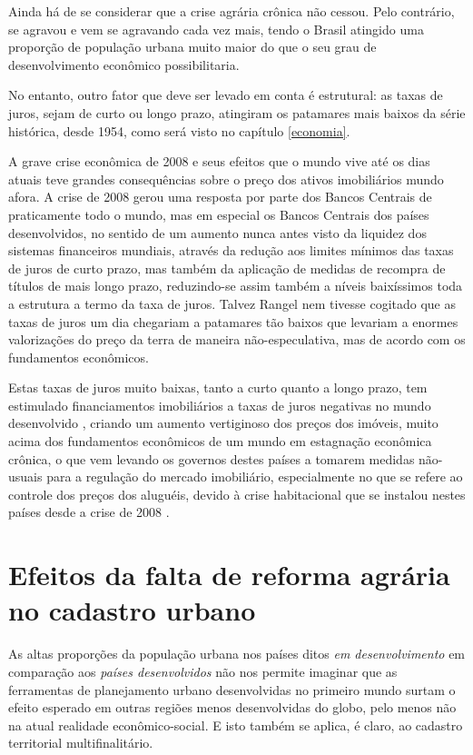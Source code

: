 \documentclass[
	12pt,				%
	oneside,			%
	a4paper,			%
	chapter=TITLE,		%
	section=TITLE,		%
	english,			%
	brazil				%
	]{abntex2}
\begin{document}
Ainda há de se considerar que a crise agrária crônica não cessou. Pelo contrário,
se agravou e vem se agravando cada vez mais, tendo o Brasil atingido uma
proporção de população urbana muito maior do que o seu grau de desenvolvimento
econômico possibilitaria.

No entanto, outro fator que deve ser levado em conta é estrutural: as taxas de
juros, sejam de curto ou longo prazo, atingiram os patamares mais baixos da
série histórica, desde 1954, como será visto no capítulo \ref{economia}.

A grave crise econômica de 2008 e seus efeitos que o mundo vive até os dias
atuais teve grandes consequências sobre o preço dos ativos imobiliários mundo
afora. A crise de 2008 gerou uma resposta por parte dos Bancos Centrais de
praticamente todo o mundo, mas em especial os Bancos Centrais dos países
desenvolvidos, no sentido de um aumento nunca antes visto da liquidez dos
sistemas financeiros mundiais, através da redução aos limites mínimos das taxas
de juros de curto prazo, mas também da aplicação de medidas de recompra de
títulos de mais longo prazo, reduzindo-se assim também a níveis baixíssimos toda
a estrutura a termo da taxa de juros. Talvez Rangel nem tivesse cogitado que as
taxas de juros um dia chegariam a patamares tão baixos que levariam a enormes
valorizações do preço da terra de maneira não-especulativa, mas de acordo com os
fundamentos econômicos.

Estas taxas de juros muito baixas, tanto a curto quanto a longo prazo, tem
estimulado financiamentos imobiliários a taxas de juros negativas no mundo
desenvolvido \autocite{serapicos}, criando um aumento vertiginoso dos preços dos
imóveis, muito acima dos fundamentos econômicos de um mundo em estagnação
econômica crônica, o que vem levando os governos destes países a tomarem medidas
não-usuais para a regulação do mercado imobiliário, especialmente no que se
refere ao controle dos preços dos aluguéis, devido à crise habitacional que se
instalou nestes países desde a crise de 2008 \autocite{berlim,londres,california,suecia,newzeland,finlandia}.

\hypertarget{efeitos-da-falta-de-reforma-agruxe1ria-no-cadastro-urbano}{%
\section{Efeitos da falta de reforma agrária no cadastro urbano}\label{efeitos-da-falta-de-reforma-agruxe1ria-no-cadastro-urbano}}

As altas proporções da população urbana nos países ditos \emph{em desenvolvimento} em
comparação aos \emph{países desenvolvidos} não nos permite imaginar que as
ferramentas de planejamento urbano desenvolvidas no primeiro mundo surtam o
efeito esperado em outras regiões menos desenvolvidas do globo, pelo menos não
na atual realidade econômico-social. E isto também se aplica, é claro, ao
cadastro territorial multifinalitário.
\end{document}
